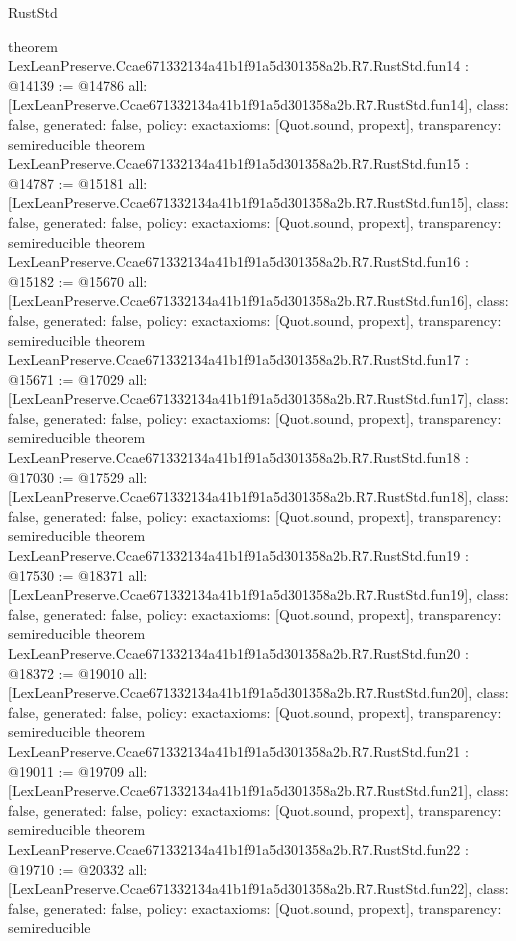 \begin{lexlean}{RustStd}
\begin{coremodule}
{}
theorem LexLeanPreserve.Ccae671332134a41b1f91a5d301358a2b.R7.RustStd.fun14 : @14139 := @14786 {
  all: [LexLeanPreserve.Ccae671332134a41b1f91a5d301358a2b.R7.RustStd.fun14],
  class: false,
  generated: false,
  policy: exact{axioms: [Quot.sound, propext]},
  transparency: semireducible
}
theorem LexLeanPreserve.Ccae671332134a41b1f91a5d301358a2b.R7.RustStd.fun15 : @14787 := @15181 {
  all: [LexLeanPreserve.Ccae671332134a41b1f91a5d301358a2b.R7.RustStd.fun15],
  class: false,
  generated: false,
  policy: exact{axioms: [Quot.sound, propext]},
  transparency: semireducible
}
theorem LexLeanPreserve.Ccae671332134a41b1f91a5d301358a2b.R7.RustStd.fun16 : @15182 := @15670 {
  all: [LexLeanPreserve.Ccae671332134a41b1f91a5d301358a2b.R7.RustStd.fun16],
  class: false,
  generated: false,
  policy: exact{axioms: [Quot.sound, propext]},
  transparency: semireducible
}
theorem LexLeanPreserve.Ccae671332134a41b1f91a5d301358a2b.R7.RustStd.fun17 : @15671 := @17029 {
  all: [LexLeanPreserve.Ccae671332134a41b1f91a5d301358a2b.R7.RustStd.fun17],
  class: false,
  generated: false,
  policy: exact{axioms: [Quot.sound, propext]},
  transparency: semireducible
}
theorem LexLeanPreserve.Ccae671332134a41b1f91a5d301358a2b.R7.RustStd.fun18 : @17030 := @17529 {
  all: [LexLeanPreserve.Ccae671332134a41b1f91a5d301358a2b.R7.RustStd.fun18],
  class: false,
  generated: false,
  policy: exact{axioms: [Quot.sound, propext]},
  transparency: semireducible
}
theorem LexLeanPreserve.Ccae671332134a41b1f91a5d301358a2b.R7.RustStd.fun19 : @17530 := @18371 {
  all: [LexLeanPreserve.Ccae671332134a41b1f91a5d301358a2b.R7.RustStd.fun19],
  class: false,
  generated: false,
  policy: exact{axioms: [Quot.sound, propext]},
  transparency: semireducible
}
theorem LexLeanPreserve.Ccae671332134a41b1f91a5d301358a2b.R7.RustStd.fun20 : @18372 := @19010 {
  all: [LexLeanPreserve.Ccae671332134a41b1f91a5d301358a2b.R7.RustStd.fun20],
  class: false,
  generated: false,
  policy: exact{axioms: [Quot.sound, propext]},
  transparency: semireducible
}
theorem LexLeanPreserve.Ccae671332134a41b1f91a5d301358a2b.R7.RustStd.fun21 : @19011 := @19709 {
  all: [LexLeanPreserve.Ccae671332134a41b1f91a5d301358a2b.R7.RustStd.fun21],
  class: false,
  generated: false,
  policy: exact{axioms: [Quot.sound, propext]},
  transparency: semireducible
}
theorem LexLeanPreserve.Ccae671332134a41b1f91a5d301358a2b.R7.RustStd.fun22 : @19710 := @20332 {
  all: [LexLeanPreserve.Ccae671332134a41b1f91a5d301358a2b.R7.RustStd.fun22],
  class: false,
  generated: false,
  policy: exact{axioms: [Quot.sound, propext]},
  transparency: semireducible
}
\end{coremodule}
\end{lexlean}
